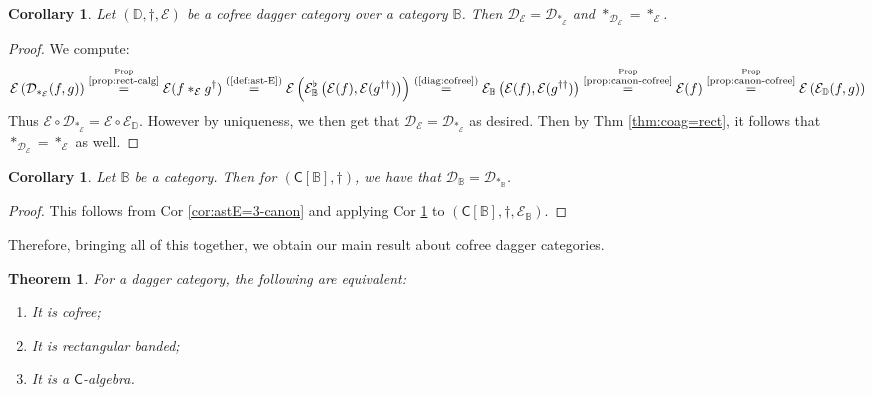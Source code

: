 \documentclass[10pt]{article}
\newtheorem{theorem}[observation]{Theorem}
\newtheorem{corollary}[observation]{Corollary}
\begin{document}
\begin{corollary}\label{cor:Dast=} Let $(\mathbb{D}, \dagger, \mathcal{E})$ be a  cofree dagger category over a category $\mathbb{B}$. Then $\mathcal{D}_\mathcal{E} = \mathcal{D}_{\ast_\mathcal{E}}$ and $\ast_{\mathcal{D}_\mathcal{E}} = \ast_{\mathcal{E}}$.
\end{corollary}
\begin{proof} We compute: 
\begin{gather*}
\mathcal{E}\left( \mathcal{D}_{\ast_\mathcal{E}}(f,g) \right) \overset{\overset{\text{Prop}}{\text{\ref{prop:rect-calg}}}}{=} \mathcal{E}(f \ast_\mathcal{E} g^\dagger) \overset{\text{(\ref{def:ast-E})}}{=} \mathcal{E}\left( \mathcal{E}^\flat_\mathbb{B}\left(  \mathcal{E}(f), \mathcal{E}(g^{\dagger\dagger}) \right) \right) \overset{\text{(\ref{diag:cofree})}}{=} \mathcal{E}_\mathbb{B}\left(  \mathcal{E}(f), \mathcal{E}(g^{\dagger\dagger}) \right) \overset{\overset{\text{Prop}}{\text{\ref{prop:canon-cofree}}}}{=} \mathcal{E}(f) \overset{\overset{\text{Prop}}{\text{\ref{prop:canon-cofree}}}}{=} \mathcal{E}\left( \mathcal{E}_\mathbb{D}(f,g) \right)
\end{gather*}
Thus $\mathcal{E} \circ \mathcal{D}_{\ast_\mathcal{E}} = \mathcal{E} \circ \mathcal{E}_\mathbb{D}$. However by uniqueness, we then get that $\mathcal{D}_\mathcal{E} = \mathcal{D}_{\ast_\mathcal{E}}$ as desired. Then by Thm \ref{thm:coag=rect}, it follows that $\ast_{\mathcal{D}_\mathcal{E}} = \ast_{\mathcal{E}}$ as well. 
\end{proof}

\begin{corollary} Let $\mathbb{B}$ be a category. Then for $(\mathsf{C}[\mathbb{B}], \dagger)$, we have that $\mathcal{D}_\mathbb{B} = \mathcal{D}_{\ast_\mathbb{B}}$.
\end{corollary}
\begin{proof} This follows from Cor \ref{cor:astE=3-canon} and applying Cor \ref{cor:Dast=} to $(\mathsf{C}[\mathbb{B}], \dagger, \mathcal{E}_\mathbb{B})$. 
\end{proof}

Therefore, bringing all of this together, we obtain our main result about cofree dagger categories. 

\begin{theorem}\label{thm:full-cofree} For a dagger category, the following are equivalent: 
\begin{enumerate}[{\em (i)}]
\item It is cofree;
\item It is rectangular banded; 
\item It is a $\mathsf{C}$-algebra. 
\end{enumerate}
\end{theorem}
\end{document}
